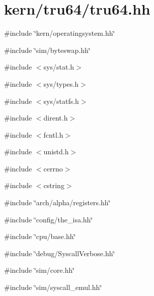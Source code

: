 \hypertarget{kern_2tru64_2tru64_8hh}{
\section{kern/tru64/tru64.hh}
\label{kern_2tru64_2tru64_8hh}
}
{\ttfamily \#include \char`\"{}kern/operatingsystem.hh\char`\"{}}\par
{\ttfamily \#include \char`\"{}sim/byteswap.hh\char`\"{}}\par
{\ttfamily \#include $<$sys/stat.h$>$}\par
{\ttfamily \#include $<$sys/types.h$>$}\par
{\ttfamily \#include $<$sys/statfs.h$>$}\par
{\ttfamily \#include $<$dirent.h$>$}\par
{\ttfamily \#include $<$fcntl.h$>$}\par
{\ttfamily \#include $<$unistd.h$>$}\par
{\ttfamily \#include $<$cerrno$>$}\par
{\ttfamily \#include $<$cstring$>$}\par
{\ttfamily \#include \char`\"{}arch/alpha/registers.hh\char`\"{}}\par
{\ttfamily \#include \char`\"{}config/the\_\-isa.hh\char`\"{}}\par
{\ttfamily \#include \char`\"{}cpu/base.hh\char`\"{}}\par
{\ttfamily \#include \char`\"{}debug/SyscallVerbose.hh\char`\"{}}\par
{\ttfamily \#include \char`\"{}sim/core.hh\char`\"{}}\par
{\ttfamily \#include \char`\"{}sim/syscall\_\-emul.hh\char`\"{}}\par
